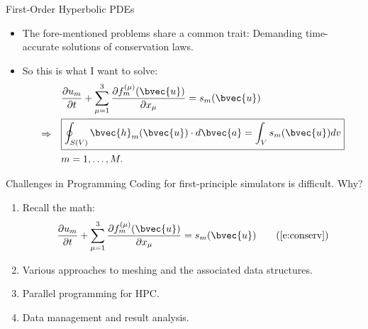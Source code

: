 \documentclass[dvips,xcolor=pst,14pt]{beamer}
\begin{document}
\begin{frame}{
%
First-Order Hyperbolic PDEs
%
}
\begin{itemize}
  \item The fore-mentioned problems share a common trait: Demanding
  time-accurate solutions of conservation laws.
  \item So this is what I want to solve:
  {\footnotesize \begin{align}
   &\frac{\partial u_m}{\partial t}
      + \sum_{\mu=1}^3\frac{\partial f^{(\mu)}_m(\bvec{u})}{\partial x_{\mu}}
      = s_m(\bvec{u}) \notag \\
    \Rightarrow \quad &\boxed{\begin{gathered}
      \oint_{S(V)}\bvec{h}_m(\bvec{u})\cdot d\bvec{a}
      = \int_{V}s_m(\bvec{u})dv
    \end{gathered}} \label{e:conserv} \\
   &m = 1, \ldots, M. \notag
  \end{align}}
\end{itemize}
\end{frame}

\begin{frame}{
%
Challenges in Programming
%
}
Coding for first-principle simulators is difficult.  Why?
\begin{enumerate}
  \item Recall the math:
  {\footnotesize \begin{align}
   \frac{\partial u_m}{\partial t}
      + \sum_{\mu=1}^3\frac{\partial f^{(\mu)}_m(\bvec{u})}{\partial x_{\mu}}
      = s_m(\bvec{u}) \tag{\ref{e:conserv}}
  \end{align}}
  \item Various approaches to meshing and the associated data structures.
  \item Parallel programming for HPC.
  \item Data management and result analysis.
\end{enumerate}
\end{frame}
\end{document}
